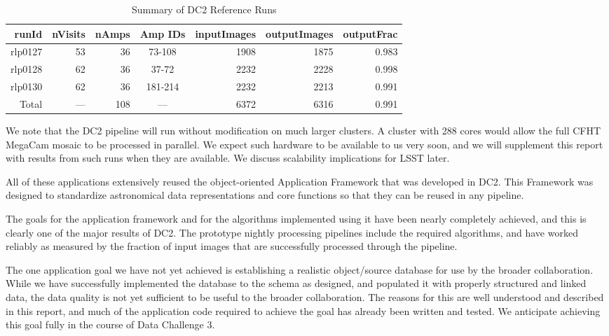 \begin{table}[htbp]
\begin{center}
\caption{Summary of DC2 Reference Runs\label{TSum-1}}
\vspace{\baselineskip}
\begin{tabular}{ | r | r | r | c | r | r | r |}
\hline
runId & nVisits & nAmps & Amp IDs & inputImages & outputImages & outputFrac \\ \hline
rlp0127 & 53 &  36 &  73-108 & 1908 & 1875 & 0.983 \\ \hline
rlp0128 & 62 &  36 &  37-72  & 2232 & 2228 & 0.998  \\ \hline
rlp0130 & 62 &  36 & 181-214 & 2232 & 2213 & 0.991 \\ \hline
Total   & --- & 108 &   ---    & 6372 & 6316 & 0.991 \\ \hline
\end{tabular}
\end{center}
\end{table}

We note that the DC2 pipeline will run without modification on much larger clusters.  A cluster with 288 cores would allow the full CFHT MegaCam mosaic to be processed in parallel.  We expect such hardware to be available to us very soon, and we will supplement this report with results from such runs when they are available.  We discuss scalability implications for LSST later.

All of these applications extensively reused the object-oriented Application Framework that was developed in DC2. This Framework was designed to standardize astronomical data representations and core functions so that they can be reused in any pipeline.

The goals for the application framework and for the algorithms implemented using it have been nearly completely achieved, and this is clearly one of the major results of DC2.  The prototype nightly processing pipelines include the required algorithms, and have worked reliably as measured by the fraction of input images that are successfully processed through the pipeline.

The one application goal we have not yet achieved is establishing a realistic object/source database for use by the broader collaboration. While we have successfully implemented the database to the schema as designed, and populated it with properly structured and linked data, the data quality is not yet sufficient to be useful to the broader collaboration.  The reasons for this are well understood and described in this report, and much of the application code required to achieve the goal has already been written and tested.  We anticipate achieving this goal fully in the course of Data Challenge 3.

